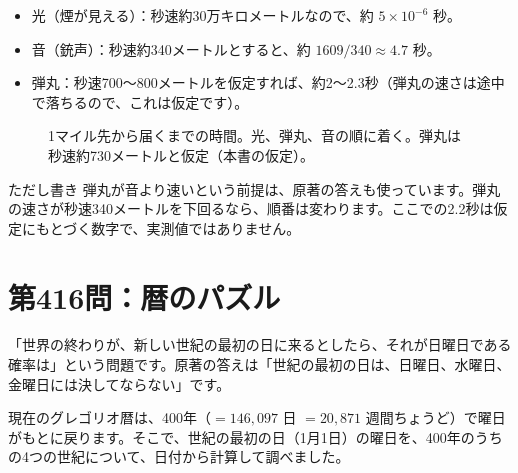 \documentclass[a4paper,11pt,openany]{ltjsbook}
\begin{document}
\begin{itemize}[leftmargin=*]
\item 光（煙が見える）：秒速約30万キロメートルなので、約 $5\times10^{-6}$ 秒。
\item 音（銃声）：秒速約340メートルとすると、約 $1609/340\approx4.7$ 秒。
\item 弾丸：秒速700〜800メートルを仮定すれば、約2〜2.3秒（弾丸の速さは途中で落ちるので、これは仮定です）。
\end{itemize}

\begin{figure}[htbp]
\centering
{}
\caption{1マイル先から届くまでの時間。光、弾丸、音の順に着く。弾丸は秒速約730メートルと仮定（本書の仮定）。}
\end{figure}

\begin{pointbox}{ただし書き}
弾丸が音より速いという前提は、原著の答えも使っています。弾丸の速さが秒速340メートルを下回るなら、順番は変わります。ここでの2.2秒は仮定にもとづく数字で、実測値ではありません。
\end{pointbox}

\section{第416問：暦のパズル}

「世界の終わりが、新しい世紀の最初の日に来るとしたら、それが日曜日である確率は」という問題です。原著の答えは「世紀の最初の日は、日曜日、水曜日、金曜日には決してならない」です。

現在のグレゴリオ暦は、400年（$=146{,}097$ 日 $=20{,}871$ 週間ちょうど）で曜日がもとに戻ります。そこで、世紀の最初の日（1月1日）の曜日を、400年のうちの4つの世紀について、日付から計算して調べました。
\end{document}
